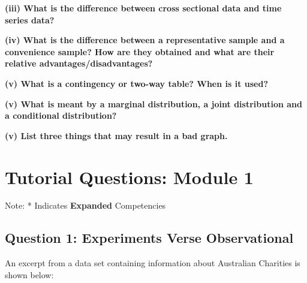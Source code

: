 \documentclass[
  11pt,
  oneside]{scrbook}
\begin{document}
\textbf{(iii) What is the difference between cross sectional data and time series data?}

\begin{answerbox}\vspace{3cm}\end{answerbox}

\textbf{(iv) What is the difference between a representative sample and a convenience sample? How are they obtained and what are their relative advantages/disadvantages?}

\begin{answerbox}\vspace{3cm}\end{answerbox}

\textbf{(v) What is a contingency or two-way table? When is it used?}

\begin{answerbox}\vspace{3cm}\end{answerbox}

\textbf{(v) What is meant by a marginal distribution, a joint distribution and a conditional distribution?}

\begin{answerbox}\vspace{3cm}\end{answerbox}

\textbf{(v) List three things that may result in a bad graph.}

\begin{answerbox}\vspace{3cm}\end{answerbox}

\chapter*{Tutorial Questions: Module 1}\label{tutorial-questions-module-1}

Note: * Indicates \textbf{Expanded} Competencies

\section{Question 1: Experiments Verse Observational}\label{question-1-experiments-verse-observational}

An excerpt from a data set containing information about Australian Charities is shown below:
\end{document}
